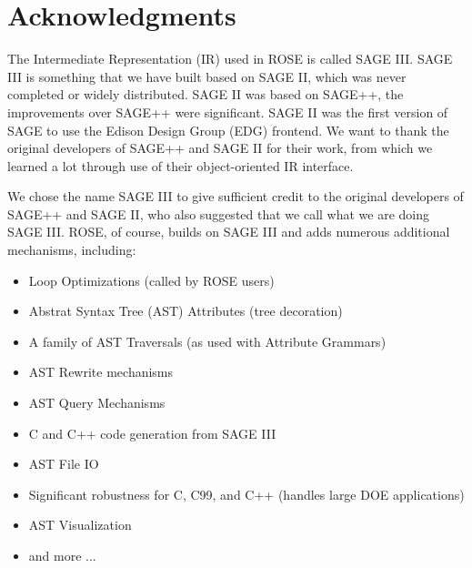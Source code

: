 
\chapter*{Acknowledgments}

% 
% 

   The Intermediate Representation (IR) used in ROSE is called SAGE III.
SAGE III is something that we have built based on SAGE II, which was never 
completed or widely distributed. SAGE II was based on SAGE++, the improvements 
over SAGE++ were significant. SAGE II was the first version of SAGE to use the 
Edison Design Group (EDG) frontend.  We want to thank the original
developers of SAGE++ and SAGE II for their work, from which we learned a lot
through use of their object-oriented IR interface.

   We chose the name SAGE III to give sufficient credit to the original developers
of SAGE++ and SAGE II, who also suggested that we call what we are doing SAGE III.  
ROSE, of course, builds on SAGE III and adds numerous additional mechanisms, 
including:
\begin{itemize}
    \item Loop Optimizations (called by ROSE users)
    \item Abstrat Syntax Tree (AST) Attributes (tree decoration)
    \item A family of AST Traversals (as used with Attribute Grammars)
    \item AST Rewrite mechanisms
    \item AST Query Mechanisms
    \item C and C++ code generation from SAGE III
    \item AST File I\/O
    \item Significant robustness for C, C99, and C++ (handles large DOE applications)
    \item AST Visualization
    \item and more ...
\end{itemize}

